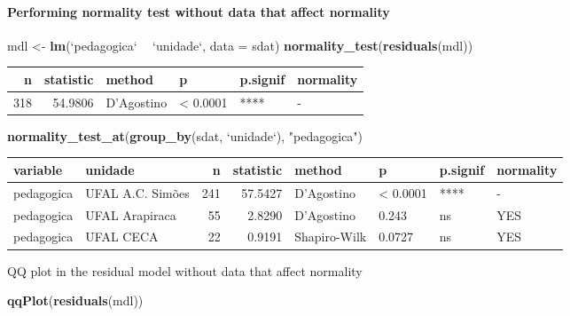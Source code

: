 \documentclass[]{article}
\newenvironment{Shaded}{\begin{snugshade}}{\end{snugshade}}
\newcommand{\DataTypeTok}[1]{\textcolor[rgb]{0.13,0.29,0.53}{#1}}
\newcommand{\KeywordTok}[1]{\textcolor[rgb]{0.13,0.29,0.53}{\textbf{#1}}}
\newcommand{\NormalTok}[1]{#1}
\newcommand{\OperatorTok}[1]{\textcolor[rgb]{0.81,0.36,0.00}{\textbf{#1}}}
\newcommand{\StringTok}[1]{\textcolor[rgb]{0.31,0.60,0.02}{#1}}
\let\oldparagraph\paragraph
\renewcommand{\paragraph}[1]{\oldparagraph{#1}\mbox{}}
\begin{document}
\hypertarget{performing-normality-test-without-data-that-affect-normality}{%
\paragraph{Performing normality test without data that affect
normality}\label{performing-normality-test-without-data-that-affect-normality}}

\begin{Shaded}
\begin{Highlighting}[]
\NormalTok{mdl <-}\StringTok{ }\KeywordTok{lm}\NormalTok{(}\StringTok{`}\DataTypeTok{pedagogica}\StringTok{`} \OperatorTok{~}\StringTok{ `}\DataTypeTok{unidade}\StringTok{`}\NormalTok{, }\DataTypeTok{data =}\NormalTok{ sdat)}
\KeywordTok{normality_test}\NormalTok{(}\KeywordTok{residuals}\NormalTok{(mdl))}
\end{Highlighting}
\end{Shaded}

\begin{longtable}[]{@{}rrllll@{}}
\toprule
n & statistic & method & p & p.signif & normality\tabularnewline
\midrule
\endhead
318 & 54.9806 & D'Agostino & \textless{} 0.0001 & **** &
-\tabularnewline
\bottomrule
\end{longtable}

\begin{Shaded}
\begin{Highlighting}[]
\KeywordTok{normality_test_at}\NormalTok{(}\KeywordTok{group_by}\NormalTok{(sdat, }\StringTok{`}\DataTypeTok{unidade}\StringTok{`}\NormalTok{), }\StringTok{"pedagogica"}\NormalTok{)}
\end{Highlighting}
\end{Shaded}

\begin{longtable}[]{@{}llrrllll@{}}
\toprule
variable & unidade & n & statistic & method & p & p.signif &
normality\tabularnewline
\midrule
\endhead
pedagogica & UFAL A.C. Simões & 241 & 57.5427 & D'Agostino & \textless{}
0.0001 & **** & -\tabularnewline
pedagogica & UFAL Arapiraca & 55 & 2.8290 & D'Agostino & 0.243 & ns &
YES\tabularnewline
pedagogica & UFAL CECA & 22 & 0.9191 & Shapiro-Wilk & 0.0727 & ns &
YES\tabularnewline
\bottomrule
\end{longtable}

QQ plot in the residual model without data that affect normality

\begin{Shaded}
\begin{Highlighting}[]
\KeywordTok{qqPlot}\NormalTok{(}\KeywordTok{residuals}\NormalTok{(mdl))}
\end{Highlighting}
\end{Shaded}
\end{document}
